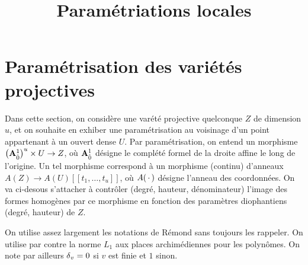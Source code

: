 


\newtheorem{thm}{Théorème}
\newtheorem{prop}[thm]{Proposition}
\newtheorem{lem}[thm]{Lemme}
\newtheorem{coro}[thm]{Corollaire}
\newtheorem{fait}[thm]{Fait}
\newtheorem*{flemme}{À démontrer plus tard}

\theoremstyle{definition}
\newtheorem{rem}{Remarque}
\newtheorem*{Rem}{Remarque}

\title{Paramétriations locales}



\maketitle

\section{Paramétrisation des variétés projectives}

Dans cette section, on considère une varété projective quelconque $Z$ de
dimension $u$, et on souhaite en exhiber une paramétrisation au voisinage d'un
point appartenant à un ouvert dense $U$. Par paramétrisation, on entend un
morphisme $\big(\mathbf{A}^1_{\hat{0}}\big)^u \times U \to Z$, où $\mathbf{A}^1_{\hat{0}}$
désigne le complété formel de la droite affine le long de l'origine. Un tel
morphisme correspond à un morphisme (continu) d'anneaux $A(Z) \to A(U)[[t_1,
\ldots, t_u]]$, où $A({\,\cdot\,})$ désigne l'anneau des coordonnées. On va ci-desous
s'attacher à contrôler (degré, hauteur, dénominateur) l'image des formes
homogènes par ce morphisme en fonction des paramètres diophantiens (degré,
hauteur) de $Z$.

On utilise assez largement les notations de Rémond sans toujours les rappeler.
On utilise par contre la norme $L_1$ aux places archimédiennes pour les
polynômes. On note par ailleurs ${\delta\smash{_v}} = 0$ si $v$ est finie et $1$ sinon.

